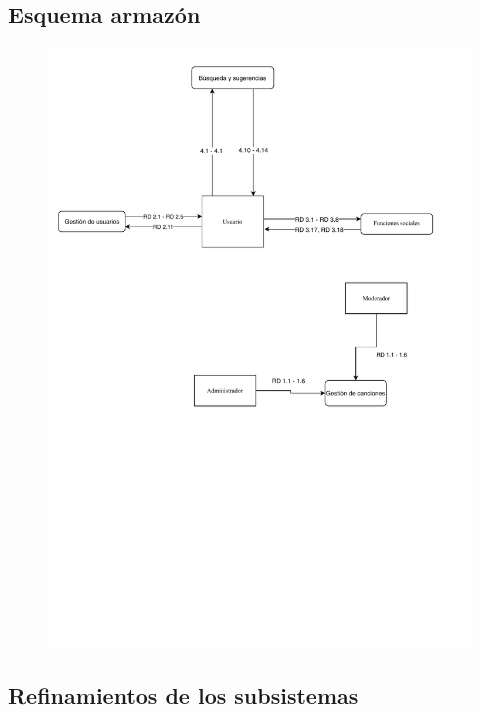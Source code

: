\subsection{Esquema armazón}

\begin{figure}[H]
  \centering
  \includegraphics[scale=0.9]{diagramas/Esquema_armazon.pdf}
\end{figure}

\subsection{Refinamientos de los subsistemas}


